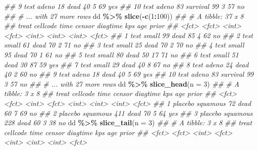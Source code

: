 \documentclass[
]{book}
\newenvironment{Shaded}{\begin{snugshade}}{\end{snugshade}}
\newcommand{\CommentTok}[1]{\textcolor[rgb]{0.56,0.35,0.01}{\textit{#1}}}
\newcommand{\DataTypeTok}[1]{\textcolor[rgb]{0.13,0.29,0.53}{#1}}
\newcommand{\DecValTok}[1]{\textcolor[rgb]{0.00,0.00,0.81}{#1}}
\newcommand{\KeywordTok}[1]{\textcolor[rgb]{0.13,0.29,0.53}{\textbf{#1}}}
\newcommand{\NormalTok}[1]{#1}
\newcommand{\OperatorTok}[1]{\textcolor[rgb]{0.81,0.36,0.00}{\textbf{#1}}}
\newcommand{\StringTok}[1]{\textcolor[rgb]{0.31,0.60,0.02}{#1}}
\begin{document}
\begin{Shaded}
\begin{Highlighting}[]
\CommentTok{\#\#  9 test  adeno       18 dead           40     5    69 yes  }
\CommentTok{\#\# 10 test  adeno       83 survival       99     3    57 no   }
\CommentTok{\#\# \# ... with 27 more rows}
\NormalTok{dd }\OperatorTok{\%\textgreater{}\%}\StringTok{ }\KeywordTok{slice}\NormalTok{(}\OperatorTok{{-}}\KeywordTok{c}\NormalTok{(}\DecValTok{1}\OperatorTok{:}\DecValTok{100}\NormalTok{))}
\CommentTok{\#\# \# A tibble: 37 x 8}
\CommentTok{\#\#    treat cellcode  time censor   diagtime   kps   age prior}
\CommentTok{\#\#    \textless{}fct\textgreater{} \textless{}fct\textgreater{}    \textless{}int\textgreater{} \textless{}fct\textgreater{}       \textless{}int\textgreater{} \textless{}int\textgreater{} \textless{}int\textgreater{} \textless{}fct\textgreater{}}
\CommentTok{\#\#  1 test  small       99 dead           85     4    62 no   }
\CommentTok{\#\#  2 test  small       61 dead           70     2    71 no   }
\CommentTok{\#\#  3 test  small       25 dead           70     2    70 no   }
\CommentTok{\#\#  4 test  small       95 dead           70     1    61 no   }
\CommentTok{\#\#  5 test  small       80 dead           50    17    71 no   }
\CommentTok{\#\#  6 test  small       51 dead           30    87    59 yes  }
\CommentTok{\#\#  7 test  small       29 dead           40     8    67 no   }
\CommentTok{\#\#  8 test  adeno       24 dead           40     2    60 no   }
\CommentTok{\#\#  9 test  adeno       18 dead           40     5    69 yes  }
\CommentTok{\#\# 10 test  adeno       83 survival       99     3    57 no   }
\CommentTok{\#\# \# ... with 27 more rows}
\NormalTok{dd }\OperatorTok{\%\textgreater{}\%}\StringTok{ }\KeywordTok{slice\_head}\NormalTok{(}\DataTypeTok{n =} \DecValTok{3}\NormalTok{)}
\CommentTok{\#\# \# A tibble: 3 x 8}
\CommentTok{\#\#   treat   cellcode  time censor diagtime   kps   age prior}
\CommentTok{\#\#   \textless{}fct\textgreater{}   \textless{}fct\textgreater{}    \textless{}int\textgreater{} \textless{}fct\textgreater{}     \textless{}int\textgreater{} \textless{}int\textgreater{} \textless{}int\textgreater{} \textless{}fct\textgreater{}}
\CommentTok{\#\# 1 placebo squamous    72 dead         60     7    69 no   }
\CommentTok{\#\# 2 placebo squamous   411 dead         70     5    64 yes  }
\CommentTok{\#\# 3 placebo squamous   228 dead         60     3    38 no}
\NormalTok{dd }\OperatorTok{\%\textgreater{}\%}\StringTok{ }\KeywordTok{slice\_tail}\NormalTok{(}\DataTypeTok{n =} \DecValTok{3}\NormalTok{)}
\CommentTok{\#\# \# A tibble: 3 x 8}
\CommentTok{\#\#   treat cellcode  time censor diagtime   kps   age prior}
\CommentTok{\#\#   \textless{}fct\textgreater{} \textless{}fct\textgreater{}    \textless{}int\textgreater{} \textless{}fct\textgreater{}     \textless{}int\textgreater{} \textless{}int\textgreater{} \textless{}int\textgreater{} \textless{}fct\textgreater{}}

\end{Highlighting}
\end{Shaded}
\end{document}
